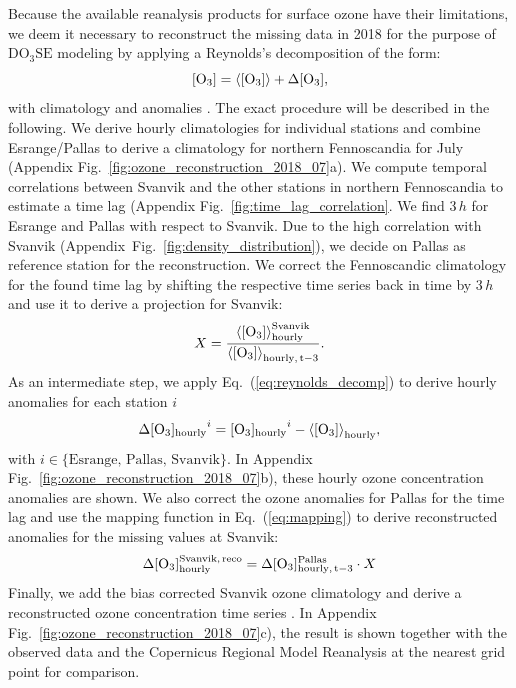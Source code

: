 \documentclass[bg, manuscript]{copernicus}
\begin{document}
Because the available reanalysis products for surface ozone have their limitations, we deem it necessary to reconstruct the missing data in 2018 for the purpose of $\mathrm{DO_3SE}$ modeling by applying a Reynolds's decomposition of the form:
\begin{equation}
  \chem{[O_3]} = \chem{\left<[O_3]\right>} + \chem{\Delta[O_3]},
  \label{eq:reynolds_decomp}
\end{equation}
with climatology \chem{\left<[O_3]\right>} and anomalies \chem{\Delta[O_3]}.
The exact procedure will be described in the following.
We derive hourly climatologies for individual stations and combine Esrange/Pallas to derive a climatology for northern Fennoscandia for July (Appendix Fig.~\ref{fig:ozone_reconstruction_2018_07}a). We compute temporal correlations between Svanvik and the other stations in northern Fennoscandia to estimate a time lag (Appendix Fig.~\ref{fig:time_lag_correlation}. We find $3\,\unit{h}$ for Esrange and Pallas with respect to Svanvik. Due to the high correlation with Svanvik (Appendix~Fig.~\ref{fig:density_distribution}), we decide on Pallas as reference station for the reconstruction. We correct the Fennoscandic climatology for the found time lag  by shifting the respective time series back in time by $3\,\unit{h}$ and use it to derive a projection for Svanvik:
\begin{equation}
  X = \frac{\chem{\left<[O_3]\right>_{hourly}^{Svanvik}}}{\chem{\left<[O_3]\right>_{hourly,\,t-3}}}.
  \label{eq:mapping}
\end{equation}
As an intermediate step, we apply Eq.~(\ref{eq:reynolds_decomp}) to derive hourly anomalies for each station $i$
\begin{equation}
  \chem{\Delta[O_3]_{hourly}}^i = \chem{[O_3]_{hourly}}^i-\chem{\left<[O_3]\right>_{hourly}},
\end{equation}
with $i \in \{\text{Esrange, Pallas, Svanvik\}}$.
In Appendix Fig.~\ref{fig:ozone_reconstruction_2018_07}b), these hourly ozone concentration anomalies are shown. We also correct the ozone anomalies for Pallas for the time lag  and use the mapping function in Eq.~(\ref{eq:mapping}) to derive reconstructed anomalies for the missing values at Svanvik:
\begin{equation}
    \chem{\Delta [O_3]_{hourly}^{Svanvik,\,reco}} = \chem{\Delta[O_3]_{hourly,\,t-3}^{Pallas}} \cdot X
\end{equation}
Finally, we add the bias corrected Svanvik ozone climatology and derive a reconstructed ozone concentration time series . In Appendix Fig.~\ref{fig:ozone_reconstruction_2018_07}c), the result is shown together with the observed data and the Copernicus Regional Model Reanalysis at the nearest grid point for comparison.
\end{document}
